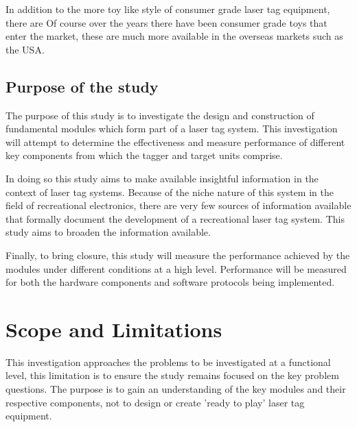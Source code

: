 In addition to the more toy like style of consumer grade laser tag equipment, there are  Of course over the years there have been consumer grade toys that enter the market, these are much more available in the overseas markets such as the USA.

\subsection{Purpose of the study}



The purpose of this study is to investigate the design and construction of fundamental modules which form part of a laser tag system. This investigation will attempt to determine the effectiveness and measure performance of different key components from which the tagger and target units comprise.

In doing so this study aims to make available insightful information in the context of laser tag systems. Because of the niche nature of this system in the field of recreational electronics, there are very few sources of information available that formally document the development of a recreational laser tag system. This study aims to broaden the information available.

Finally, to bring closure, this study will measure the performance achieved by the modules under different conditions at a high level. Performance will be measured for both the hardware components and software protocols being implemented.


\section{Scope and Limitations}

This investigation approaches the problems to be investigated at a functional level, this limitation is to ensure the study remains focused on the key problem questions. The purpose is to gain an understanding of the key modules and their respective components, not to design or create 'ready to play' laser tag equipment.

